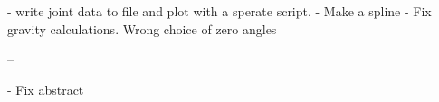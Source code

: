 - write joint data to file and plot with a sperate script. 
- Make a spline 
- Fix gravity calculations. Wrong choice of zero angles

--

- Fix abstract
